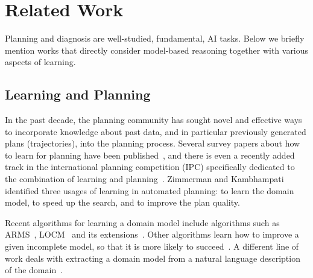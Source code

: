 \documentclass[12pt]{article}
\newcommand{\note}[1]{\textbf{\textit{#1}}}
\begin{document}
\section{Related Work}
Planning and diagnosis are well-studied, fundamental, AI tasks. %
Below we briefly mention works that directly consider model-based reasoning together with various aspects of learning. 

\subsection{Learning and Planning}


In the past decade, the planning community has sought novel and effective ways to incorporate knowledge about past data, and in particular previously generated plans (trajectories), into the planning process. 
Several survey papers about how to learn for planning have been published~\cite{minton2014machine,zimmerman2003learning,jimenez2012review}, 
and there is even a recently added track in the international planning competition (IPC) specifically dedicated to the combination of learning and planning~\cite{fern2011first}. 
Zimmerman and Kambhampati~\cite{zimmerman2003learning} identified three usages of learning in automated planning: to learn the domain model, to speed up the search, and to improve the plan quality. 

 Recent algorithms for learning a domain model include algorithms such as ARMS~\cite{yang2007learning}, 
LOCM~\cite{cresswell2013acquiring} and its extensions~\cite{gregory2015domain,gregory2016domain}. 
Other algorithms learn how to improve a given incomplete model, so that it is more likely to succeed~\cite{nguyen2017robustPlanning,jimenez2012review}.
A different line of work deals with extracting a domain model from a natural language description of the domain~\cite{lindsay2017framer}.
\end{document}
